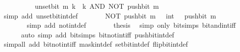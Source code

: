 \begin{isabellebody}
\ \ \isamarkupfalse%
\ {\isacharminus}{\kern0pt}\isanewline
\ \ \ \ \isamarkupfalse%
\ {\isacartoucheopen}unset{\isacharunderscore}{\kern0pt}bit\ m\ k\ {\isacharequal}{\kern0pt}\ k\ AND\ NOT\ {\isacharparenleft}{\kern0pt}push{\isacharunderscore}{\kern0pt}bit\ m\ {}{\isacharparenright}{\kern0pt}{\isacartoucheclose}\isanewline
\ \ \ \ \ \ \isamarkupfalse%
\ {\isacharparenleft}{\kern0pt}simp\ add{\isacharcolon}{\kern0pt}\ unset{\isacharunderscore}{\kern0pt}bit{\isacharunderscore}{\kern0pt}int{\isacharunderscore}{\kern0pt}def{\isacharparenright}{\kern0pt}\isanewline
\ \ \ \ \isamarkupfalse%
\ \isamarkupfalse%
\ {\isacartoucheopen}NOT\ {\isacharparenleft}{\kern0pt}push{\isacharunderscore}{\kern0pt}bit\ m\ {}\ {\isacharcolon}{\kern0pt}{\isacharcolon}{\kern0pt}\ int{\isacharparenright}{\kern0pt}\ {\isacharequal}{\kern0pt}\ {\isacharminus}{\kern0pt}\ {\isacharparenleft}{\kern0pt}push{\isacharunderscore}{\kern0pt}bit\ m\ {}\ {\isacharplus}{\kern0pt}\ {}{\isacharparenright}{\kern0pt}{\isacartoucheclose}\isanewline
\ \ \ \ \ \ \isamarkupfalse%
\ {\isacharparenleft}{\kern0pt}simp\ add{\isacharcolon}{\kern0pt}\ not{\isacharunderscore}{\kern0pt}int{\isacharunderscore}{\kern0pt}def{\isacharparenright}{\kern0pt}\isanewline
\ \ \ \ \isamarkupfalse%
\ \isamarkupfalse%
\ {\isacharquery}{\kern0pt}thesis\ \isamarkupfalse%
\ {\isacharparenleft}{\kern0pt}simp\ only{\isacharcolon}{\kern0pt}\ bit{\isacharunderscore}{\kern0pt}simps\ bit{\isacharunderscore}{\kern0pt}and{\isacharunderscore}{\kern0pt}int{\isacharunderscore}{\kern0pt}iff{\isacharparenright}{\kern0pt}\isanewline
\ \ \ \ \ \ {\isacharparenleft}{\kern0pt}auto\ simp\ add{\isacharcolon}{\kern0pt}\ bit{\isacharunderscore}{\kern0pt}simps\ bit{\isacharunderscore}{\kern0pt}not{\isacharunderscore}{\kern0pt}int{\isacharunderscore}{\kern0pt}iff{\isacharprime}{\kern0pt}\ push{\isacharunderscore}{\kern0pt}bit{\isacharunderscore}{\kern0pt}int{\isacharunderscore}{\kern0pt}def{\isacharparenright}{\kern0pt}\isanewline
\ \ \isamarkupfalse%
\isanewline
{}\isamarkupfalse%
\ {\isacharparenleft}{\kern0pt}simp{\isacharunderscore}{\kern0pt}all\ add{\isacharcolon}{\kern0pt}\ bit{\isacharunderscore}{\kern0pt}not{\isacharunderscore}{\kern0pt}int{\isacharunderscore}{\kern0pt}iff\ mask{\isacharunderscore}{\kern0pt}int{\isacharunderscore}{\kern0pt}def\ set{\isacharunderscore}{\kern0pt}bit{\isacharunderscore}{\kern0pt}int{\isacharunderscore}{\kern0pt}def\ flip{\isacharunderscore}{\kern0pt}bit{\isacharunderscore}{\kern0pt}int{\isacharunderscore}{\kern0pt}def\isanewline

\end{isabellebody}

